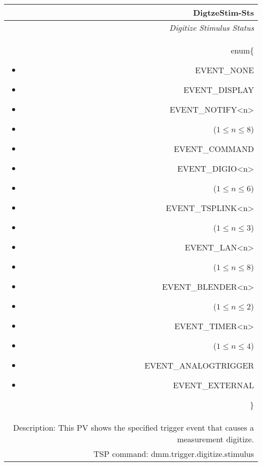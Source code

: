 \documentclass[openany]{article}
\begin{document}
		\begin{tabular}{N}
			\hline
			\bfseries DigtzeStim-Sts\label{pv:digtzestim-sts} \\ \hline
			\emph{Digitize Stimulus Status} \\
			enum\{\begin{itemize}[noitemsep]
				\small
				\item[] EVENT\_NONE
				\item[] EVENT\_DISPLAY
				\item[] EVENT\_NOTIFY\textless n\textgreater
				\item[] ($1\leq n\leq 8$)
				\item[] EVENT\_COMMAND
				\item[] EVENT\_DIGIO\textless n\textgreater
				\item[] ($1\leq n\leq 6$)
				\item[] EVENT\_TSPLINK\textless n\textgreater
				\item[] ($1\leq n\leq 3$)
				\item[] EVENT\_LAN\textless n\textgreater
				\item[] ($1\leq n\leq 8$)
				\item[] EVENT\_BLENDER\textless n\textgreater 
				\item[] ($1\leq n\leq 2$)
				\item[] EVENT\_TIMER\textless n\textgreater
				\item[] ($1\leq n\leq 4$)
				\item[] EVENT\_ANALOGTRIGGER
				\item[] EVENT\_EXTERNAL
			\end{itemize}\} \\
			Description: This PV shows the specified trigger event that causes a measurement digitize. \\
			TSP command: dmm.trigger.digitize.stimulus
		\end{tabular}
\end{document}
